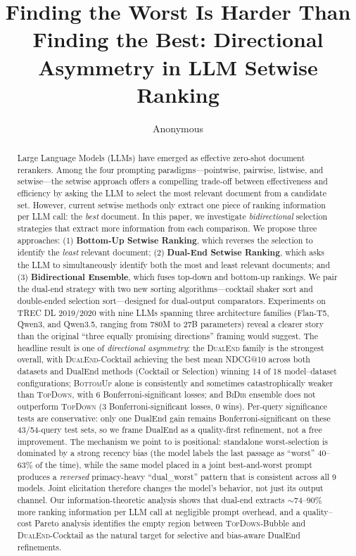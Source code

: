 \documentclass[sigconf,natbib=true,anonymous=true]{acmart}
\newcommand{\topdown}{\textsc{TopDown}}
\newcommand{\bottomup}{\textsc{BottomUp}}
\newcommand{\dualend}{\textsc{DualEnd}}
\newcommand{\bidir}{\textsc{BiDir}}
\begin{document}
\title{Finding the Worst Is Harder Than Finding the Best: Directional Asymmetry in LLM Setwise Ranking}

\author{Anonymous}

\begin{abstract}
Large Language Models (LLMs) have emerged as effective zero-shot document rerankers. Among the four prompting paradigms---pointwise, pairwise, listwise, and setwise---the setwise approach offers a compelling trade-off between effectiveness and efficiency by asking the LLM to select the most relevant document from a candidate set. However, current setwise methods only extract one piece of ranking information per LLM call: the \emph{best} document. In this paper, we investigate \emph{bidirectional} selection strategies that extract more information from each comparison. We propose three approaches: (1) \textbf{Bottom-Up Setwise Ranking}, which reverses the selection to identify the \emph{least} relevant document; (2) \textbf{Dual-End Setwise Ranking}, which asks the LLM to simultaneously identify both the most and least relevant documents; and (3) \textbf{Bidirectional Ensemble}, which fuses top-down and bottom-up rankings. We pair the dual-end strategy with two new sorting algorithms---cocktail shaker sort and double-ended selection sort---designed for dual-output comparators. Experiments on TREC DL 2019/2020 with nine LLMs spanning three architecture families (Flan-T5, Qwen3, and Qwen3.5, ranging from 780M to 27B parameters) reveal a clearer story than the original ``three equally promising directions'' framing would suggest. The headline result is one of \emph{directional asymmetry}: the \dualend{} family is the strongest overall, with \dualend{}-Cocktail achieving the best mean NDCG@10 across both datasets and DualEnd methods (Cocktail or Selection) winning 14 of 18 model--dataset configurations; \bottomup{} alone is consistently and sometimes catastrophically weaker than \topdown{}, with 6 Bonferroni-significant losses; and \bidir{} ensemble does not outperform \topdown{} (3 Bonferroni-significant losses, 0 wins). Per-query significance tests are conservative: only one DualEnd gain remains Bonferroni-significant on these 43/54-query test sets, so we frame DualEnd as a quality-first refinement, not a free improvement. The mechanism we point to is positional: standalone worst-selection is dominated by a strong recency bias (the model labels the last passage as ``worst'' 40--63\% of the time), while the same model placed in a joint best-and-worst prompt produces a \emph{reversed} primacy-heavy ``dual\_worst'' pattern that is consistent across all 9 models. Joint elicitation therefore changes the model's behavior, not just its output channel. Our information-theoretic analysis shows that dual-end extracts $\sim$$74$--$90$\% more ranking information per LLM call at negligible prompt overhead, and a quality--cost Pareto analysis identifies the empty region between \topdown{}-Bubble and \dualend{}-Cocktail as the natural target for selective and bias-aware DualEnd refinements.
\end{abstract}
\end{document}
